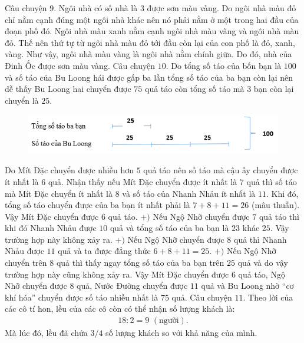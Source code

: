 \vskip 0.1cm
Câu chuyện $9.$
\vskip 0.1cm
Ngôi nhà có số nhà là $3$ được sơn màu vàng. Do ngôi nhà màu đỏ chỉ nằm cạnh đúng một ngôi nhà khác nên nó phải nằm ở một trong hai đầu của đoạn phố đó. Ngôi nhà màu xanh nằm cạnh ngôi nhà màu vàng và ngôi nhà màu đỏ. Thế nên thứ tự từ ngôi nhà màu đỏ tới đầu còn lại của con phố là đỏ, xanh, vàng. Như vậy, ngôi nhà màu vàng là ngôi nhà nằm chính giữa. Do đó, nhà của Đinh Ốc được sơn màu vàng.
\vskip 0.1cm
Câu chuyện $10.$
\vskip 0.1cm
Do tổng số táo của bốn bạn là $100$ và số táo của Bu Loong hái được gấp ba lần tổng số táo của ba bạn còn lại nên dễ thấy Bu Loong hai chuyển được $75$ quả táo còn tổng số táo mà $3$ bạn còn lại chuyển là $25$. 
\begin{figure}[H]
	\centering
	\vspace*{-5pt}
	\captionsetup{labelformat= empty, justification=centering}
	\includegraphics[width=1\linewidth]{9}
	\vspace*{-15pt}
\end{figure}
Do Mít Đặc chuyển được nhiều hơn $5$ quả táo nên số táo mà cậu ấy chuyển được ít nhất là $6$ quả.
\vskip 0.1cm
Nhận thấy nếu Mít Đặc chuyển được ít nhất là $7$ quả thì số táo mà Mít Đặc chuyển ít nhất là $8$ và số táo của Nhanh Nhảu ít nhất là $11$. Khi đó, tổng số táo chuyển được của ba bạn ít nhất phải là $7 + 8 + 11 = 26$ (mâu thuẫn).
\vskip 0.1cm
Vậy Mít Đặc chuyển được $6$ quả táo. 
\vskip 0.1cm
$+)$ Nếu Ngộ Nhỡ chuyển được $7$ quả táo thì khi đó Nhanh Nhảu được $10$ quả và tổng số táo của ba bạn là $23$ khác $25$. Vậy trường hợp này không xảy ra.
\vskip 0.1cm
$+)$ Nếu Ngộ Nhỡ chuyển được $8$ quả thì Nhanh Nhảu được $11$ quả và ta được đẳng thức $6+8+11= 25$.
\vskip 0.1cm
$+)$ Nếu Ngộ Nhỡ chuyển trên $8$ quả thì thấy ngay tổng số táo của ba bạn trên $25$ quả và do vậy trường hợp này cũng không xảy ra.
\vskip 0.1cm
Vậy Mít Đặc chuyển được $6$ quả táo, Ngộ Nhỡ chuyển được $8$ quả, Nước Đường chuyển được $11$ quả và Bu Loong nhờ “cơ khí hóa” chuyển được số táo nhiều nhất là $75$ quả.
\vskip 0.1cm
Câu chuyện $11.$ 
Theo lời của các cô tí hon, lều của các cô còn có thể nhận số lượng khách là:
\begin{align*}
	18 : 2 = 9 \,\,(\text{người}).
\end{align*}
Mà lúc đó, lều đã chứa $3/4$ số lượng khách so với khả năng của mình.
